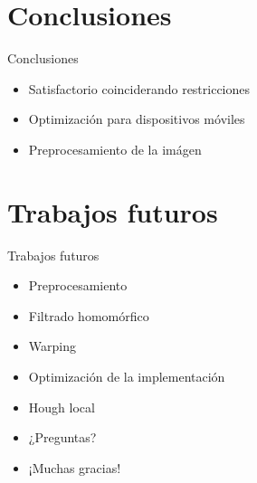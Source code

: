 \documentclass[spanish]{beamer}
\begin{document}
\section{Conclusiones}
\begin{frame}{Conclusiones}
  \begin{itemize}
  \item Satisfactorio coinciderando restricciones
  \item Optimización para dispositivos móviles
  \item Preprocesamiento de la imágen
  \end{itemize}
\end{frame}
%
\section{Trabajos futuros}
\begin{frame}{Trabajos futuros}
  \begin{itemize}
  \item Preprocesamiento
  \item Filtrado homomórfico
  \item Warping
  \item Optimización de la implementación
  \item Hough local
  \end{itemize}
\end{frame}
\begin{frame}{}
  \begin{itemize}
  \item<1-1> ¿Preguntas?
  \item<2-2> ¡Muchas gracias!
  \end{itemize}
\end{frame}
\end{document}

